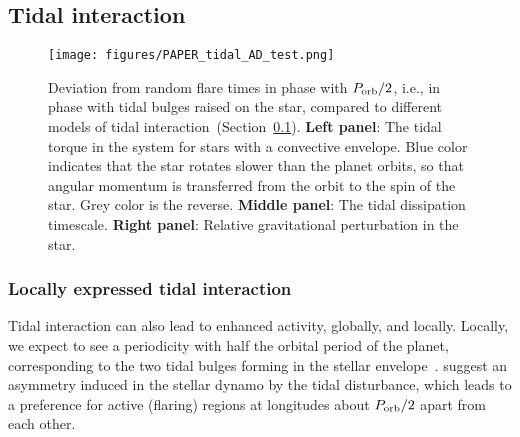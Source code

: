 \documentclass[twocolumn]{aastex631}
\begin{document}






\subsection{Tidal interaction}
\label{sec:discussion:tidal}
\begin{figure*}[t]
    \begin{centering}
        \texttt{[image: figures/PAPER\_tidal\_AD\_test.png]}
    \caption{Deviation from random flare times in phase with $P_{\rm orb}/2$, i.e., in phase with tidal bulges raised on the star, compared to different models of tidal interaction~(Section~\ref{sec:discussion:tidal}).
           \textbf{Left panel}: The tidal torque in the system for stars with a convective envelope. Blue color indicates that the star rotates slower than the planet orbits, so that angular momentum is transferred from the orbit to the spin of the star. Grey color is the reverse. \textbf{Middle panel}: The tidal dissipation timescale. \textbf{Right panel}:  Relative gravitational perturbation in the star.}
        \label{fig:tidal}
    \end{centering}
\end{figure*}

\begin{table*}
\footnotesize
\movetableright=-20mm
\caption{Flaring tidal star-planet interaction parameters and $p$-value of the custom Anderson-Darling test. }

    \label{tab:tidal}
 \tablerefs{}
\end{table*}

\subsubsection{Locally expressed tidal interaction}
Tidal interaction can also lead to enhanced activity, globally, and locally.  Locally, we expect to see a periodicity with half the orbital period of the planet, corresponding to the two tidal bulges forming in the stellar envelope~\citep{cuntz2000stellar}. \citet{holzwarth2003dynamics} suggest an asymmetry induced in the stellar dynamo by the tidal disturbance, which leads to a preference for active (flaring) regions at longitudes about $P_{\rm orb}/2$ apart from each other. 
\end{document}
